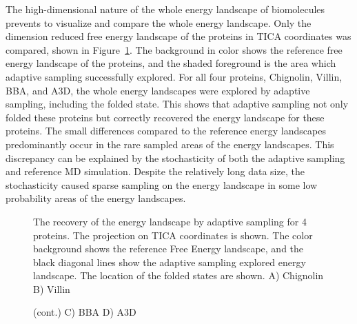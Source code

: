 The high-dimensional nature of the whole energy landscape of biomolecules prevents to visualize and compare the whole energy landscape. Only the dimension reduced free energy landscape of the proteins in TICA coordinates was compared, shown in Figure~\ref{fig:overlap}. The background in color shows the reference free energy landscape of the proteins, and the shaded foreground is the area which adaptive sampling successfully explored. For all four proteins, Chignolin, Villin, BBA, and A3D, the whole energy landscapes were explored by adaptive sampling, including the folded state. This shows that adaptive sampling not only folded these proteins but correctly recovered the energy landscape for these proteins.  The small differences compared to the reference energy landscapes predominantly occur in the rare sampled areas of the energy landscapes. This discrepancy can be explained by the stochasticity of both the adaptive sampling and reference MD simulation. Despite the relatively long data size, the stochasticity caused sparse sampling on the energy landscape in some low probability areas of the energy landscapes.  


\begin{figure}[H]
\centering
   \begin{subfigure}[b]{0.6\linewidth}
   {}
   \end{subfigure}%
   
   \begin{subfigure}[b]{0.6\linewidth}
   {}
   \end{subfigure}%


  \caption{The recovery of the energy landscape by adaptive sampling for 4 proteins. The projection on TICA coordinates is shown. The
 color background shows the reference Free Energy landscape, and the black diagonal lines show the adaptive sampling explored energy landscape. The location of the folded states are shown.  A) Chignolin B) Villin }
\end{figure}

\begin{figure}[H]\ContinuedFloat
\centering
   \begin{subfigure}[b]{0.6\linewidth}
   {}
   \end{subfigure}%
  
   \begin{subfigure}[b]{0.6\linewidth}
   {}
   \end{subfigure}%

  \caption{(cont.) C) BBA D) A3D} 
  \label{fig:overlap}
\end{figure}

